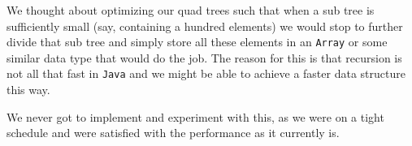 We thought about optimizing our quad trees such that when a sub tree is sufficiently small (say, containing a hundred elements) we would stop to further divide that sub tree and simply store all these elements in an \texttt{Array} or some similar data type that would do the job. The reason for this is that recursion is not all that fast in \texttt{Java} and we might be able to achieve a faster data structure this way.

We never got to implement and experiment with this, as we were on a tight schedule and were satisfied with the performance as it currently is.